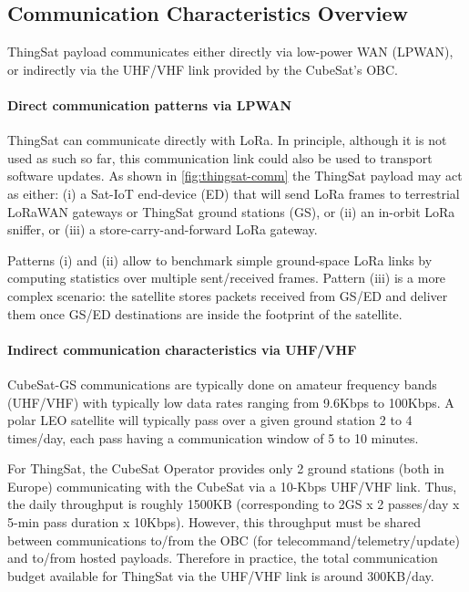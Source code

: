 \subsection{Communication Characteristics Overview}
\label{sec:thingsat-comm-characteristics}

ThingSat payload communicates either directly via low-power WAN (LPWAN), or indirectly
via the UHF/VHF link provided by the CubeSat's OBC.

\paragraph*{Direct communication patterns via LPWAN}
ThingSat can communicate directly with LoRa. In principle, although it is not used as
such so far, this communication link could also be used to transport software updates.
As shown in \autoref{fig:thingsat-comm} the ThingSat payload may act as either:
(i) a Sat-IoT end-device (ED) that will send LoRa frames to terrestrial LoRaWAN gateways or ThingSat ground stations (GS), or
(ii) an in-orbit LoRa sniffer, or
(iii) a store-carry-and-forward LoRa gateway.

Patterns (i) and (ii) allow to benchmark simple ground-space LoRa links by
computing statistics over multiple sent/received frames.
Pattern (iii) is a more
complex scenario: the satellite stores packets received from GS/ED and deliver
them once GS/ED destinations are inside the footprint of the satellite.

\paragraph*{Indirect communication characteristics via UHF/VHF}
CubeSat-GS communications are typically done on amateur frequency
bands (UHF/VHF) with typically low data rates ranging from 9.6Kbps to
100Kbps.
A polar LEO satellite will typically pass over a given ground station 2 to 4 times/day,
each pass having a communication window of 5 to 10 minutes.

For ThingSat, the CubeSat Operator provides only 2 ground stations (both in Europe) communicating with
the CubeSat via a 10-Kbps UHF/VHF link. Thus, the daily throughput is roughly
1500KB (corresponding to 2GS x 2 passes/day x 5-min pass duration x 10Kbps).
However, this throughput must be shared between communications to/from the OBC
(for telecommand/telemetry/update) and to/from hosted payloads. Therefore in practice,
the total communication budget available for ThingSat via the UHF/VHF link is around
300KB/day.

